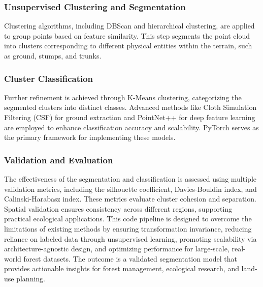 \documentclass[../report.tex]{subfiles}
\begin{document}
\subsubsection{Unsupervised Clustering and Segmentation}
Clustering algorithms, including DBScan\cite{DBSCAN} and hierarchical clustering, are applied to group points based on feature similarity. This step segments the point cloud into clusters corresponding to different physical entities within the terrain, such as ground, stumps, and trunks\cite{DBSCan_Grammarly}.
\subsubsection{Cluster Classification}
Further refinement is achieved through K-Means clustering, categorizing the segmented clusters into distinct classes. Advanced methods like Cloth Simulation Filtering (CSF)\cite{ClothSF} for ground extraction and PointNet++\cite{PointNet++} for deep feature learning are employed to enhance classification accuracy and scalability. PyTorch serves as the primary framework for implementing these models.
\subsubsection{Validation and Evaluation}
The effectiveness of the segmentation and classification is assessed using multiple validation metrics, including the silhouette coefficient, Davies-Bouldin index\cite{Davies-Bouldin}, and Calinski-Harabasz index\cite{Calinski}. These metrics evaluate cluster cohesion and separation. Spatial validation ensures consistency across different regions, supporting practical ecological applications.
This code pipeline is designed to overcome the limitations of existing methods by ensuring transformation invariance, reducing reliance on labeled data through unsupervised learning, promoting scalability via architecture-agnostic design, and optimizing performance for large-scale, real-world forest datasets. The outcome is a validated segmentation model that provides actionable insights for forest management, ecological research, and land-use planning.

\end{document}
